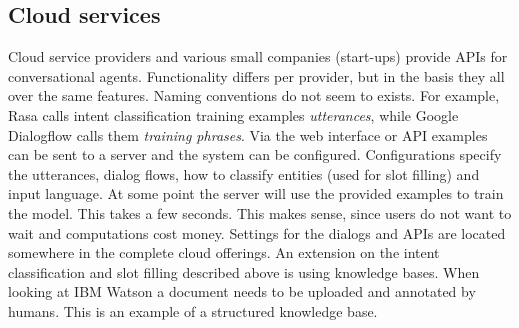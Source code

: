 \subsection{Cloud services}
\label{subsec:cloud_services}
Cloud service providers and various small companies (start-ups) provide APIs for conversational agents.
Functionality differs per provider, but in the basis they all over the same features.
Naming conventions do not seem to exists.
For example, Rasa calls intent classification training examples \textit{utterances}, while Google Dialogflow calls them \textit{training phrases}.
Via the web interface or API examples can be sent to a server and the system can be configured.
Configurations specify the utterances, dialog flows, how to classify entities (used for slot filling) and input language.
At some point the server will use the provided examples to train the model.
This takes a few seconds.
This makes sense, since users do not want to wait and computations cost money.
Settings for the dialogs and APIs are located somewhere in the complete cloud offerings.
An extension on the intent classification and slot filling described above is using knowledge bases.
When looking at IBM Watson a document needs to be uploaded and annotated by humans.
This is an example of a structured knowledge base.

